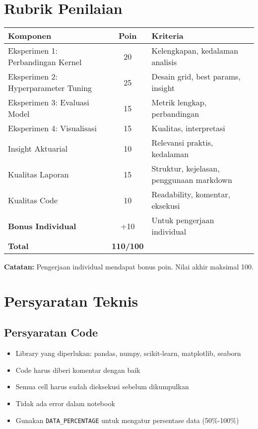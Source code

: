 \documentclass[12pt,a4paper]{article}
\begin{document}
\section{Rubrik Penilaian}

\begin{table}[h]
\centering
\begin{tabular}{@{}p{7cm}cp{6cm}@{}}
\toprule
\textbf{Komponen} & \textbf{Poin} & \textbf{Kriteria} \\ \midrule
Eksperimen 1: Perbandingan Kernel & 20 & Kelengkapan, kedalaman analisis \\
Eksperimen 2: Hyperparameter Tuning & 25 & Desain grid, best params, insight \\
Eksperimen 3: Evaluasi Model & 15 & Metrik lengkap, perbandingan \\
Eksperimen 4: Visualisasi & 15 & Kualitas, interpretasi \\
Insight Aktuarial & 10 & Relevansi praktis, kedalaman \\
Kualitas Laporan & 15 & Struktur, kejelasan, penggunaan markdown \\
Kualitas Code & 10 & Readability, komentar, eksekusi \\
\midrule
\textbf{Bonus Individual} & +10 & Untuk pengerjaan individual \\
\textbf{Total} & \textbf{110/100} & \\ \bottomrule
\end{tabular}
\end{table}

\textbf{Catatan:} Pengerjaan individual mendapat bonus poin. Nilai akhir maksimal 100.

\section{Persyaratan Teknis}

\subsection{Persyaratan Code}
\begin{itemize}
    \item Library yang diperlukan: pandas, numpy, scikit-learn, matplotlib, seaborn
    \item Code harus diberi komentar dengan baik
    \item Semua cell harus sudah dieksekusi sebelum dikumpulkan
    \item Tidak ada error dalam notebook
    \item Gunakan \texttt{DATA\_PERCENTAGE} untuk mengatur persentase data (50\%-100\%)
\end{itemize}
\end{document}
